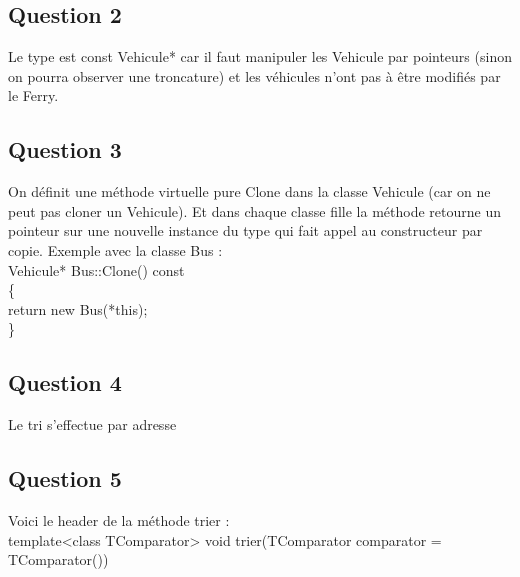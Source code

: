 \documentclass{article}
\begin{document}
\subsection{Question 2}
Le type est const Vehicule* car il faut manipuler les Vehicule par pointeurs (sinon on pourra observer une troncature) et les v\'ehicules n'ont pas \`a \^etre modifi\'es par le Ferry.
\subsection{Question 3}
On d\'efinit une m\'ethode virtuelle pure Clone dans la classe Vehicule (car on ne peut pas cloner un Vehicule). Et dans chaque classe fille la m\'ethode retourne un pointeur sur une nouvelle instance du type qui fait appel au constructeur par copie. Exemple avec la classe Bus :\\
Vehicule* Bus::Clone() const\\
\{ \\
return new Bus(*this); \\
\}
\subsection{Question 4}
Le tri s'effectue par adresse
\subsection{Question 5}
Voici le header de la m\'ethode trier :\\
template<class TComparator> void trier(TComparator comparator = TComparator())
\end{document}

